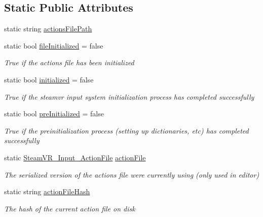 \subsection*{Static Public Attributes}
\begin{DoxyCompactItemize}
\item 
static string \mbox{\hyperlink{class_valve_1_1_v_r_1_1_steam_v_r___input_abe954f3809b1dc96cc8e337a1f80d35e}{actions\+File\+Path}}
\item 
static bool \mbox{\hyperlink{class_valve_1_1_v_r_1_1_steam_v_r___input_ad2462a9ce2841cd0dab1a79fd176568b}{file\+Initialized}} = false
\begin{DoxyCompactList}\small\item\em True if the actions file has been initialized \end{DoxyCompactList}\item 
static bool \mbox{\hyperlink{class_valve_1_1_v_r_1_1_steam_v_r___input_a2a5ac88955294a891324af8121e02f3e}{initialized}} = false
\begin{DoxyCompactList}\small\item\em True if the steamvr input system initialization process has completed successfully \end{DoxyCompactList}\item 
static bool \mbox{\hyperlink{class_valve_1_1_v_r_1_1_steam_v_r___input_ae02e7c3deb284bc92aaf7ac005e6afbe}{pre\+Initialized}} = false
\begin{DoxyCompactList}\small\item\em True if the preinitialization process (setting up dictionaries, etc) has completed successfully \end{DoxyCompactList}\item 
static \mbox{\hyperlink{class_valve_1_1_v_r_1_1_steam_v_r___input___action_file}{Steam\+V\+R\+\_\+\+Input\+\_\+\+Action\+File}} \mbox{\hyperlink{class_valve_1_1_v_r_1_1_steam_v_r___input_a72db21f575efb1323adffa0a93c70471}{action\+File}}
\begin{DoxyCompactList}\small\item\em The serialized version of the actions file we\textquotesingle{}re currently using (only used in editor) \end{DoxyCompactList}\item 
static string \mbox{\hyperlink{class_valve_1_1_v_r_1_1_steam_v_r___input_ae24acec08f56ba0533c424fd8fed4f2c}{action\+File\+Hash}}
\begin{DoxyCompactList}\small\item\em The hash of the current action file on disk \end{DoxyCompactList}\item 

\end{DoxyCompactItemize}
